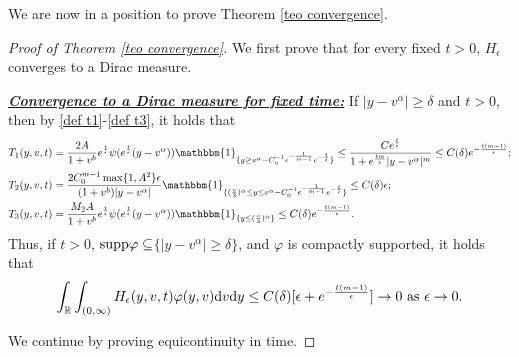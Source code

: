 \documentclass[11pt]{article}
\numberwithin{equation}{section}
\newcommand{\supp}{\textup{supp}}
\newcommand{\der}{\textup{d}}
\begin{document}
We are now in a position to prove Theorem \ref{teo convergence}.
\begin{proof}[Proof of Theorem \ref{teo convergence}] 

We first prove that for every fixed $t>0$, $H_{\epsilon}$ converges to a Dirac measure.

\vspace{0.2cm}

\noindent\underline{\textbf{\textit{Convergence to a Dirac measure for fixed time:}}} If $|y-v^{\alpha}|\geq \delta$ and $t>0$, then by \eqref{def t1}-\eqref{def t3}, it holds that
\begin{align*}
    T_{1}(y,v,t)&=  \frac{2A}{1+v^{b}}e^{\frac{t}{\epsilon}}\psi(e^{\frac{t}{\epsilon}}(y-v^{\alpha}))\mathbbm{1}_{\{y\geq v^{\alpha}-C_{0}^{-1}\epsilon^{-\frac{1}{m-1}}  e^{-\frac{t}{\epsilon}}\}}\leq \frac{ Ce^{\frac{t}{\epsilon}}}{1+e^{\frac{tm}{\epsilon}}|y-v^{\alpha}|^{m}}\leq C(\delta)e^{-\frac{t(m-1)}{\epsilon}};\\
   T_{2}(y,v,t)&=\frac{2C_{0}^{m-1}\max\{1,A^{2}\}\epsilon}{(1+v^{b})|y-v^{\alpha}|}\mathbbm{1}_{\{(\frac{v}{3})^{\alpha}\leq y\leq v^{\alpha}-C_{0}^{-1}\epsilon^{-\frac{1}{m-1}}  e^{-\frac{t}{\epsilon}}\}}\leq C(\delta)\epsilon;\\
     T_{3}(y,v,t)&=  \frac{M_{2}A}{1+v^{b}}e^{\frac{t}{\epsilon}}\psi(e^{\frac{t}{\epsilon}}(y-v^{\alpha}))\mathbbm{1}_{\{y\leq (\frac{v}{3})^{\alpha}\}}\leq C(\delta)e^{-\frac{t(m-1)}{\epsilon}}.
\end{align*}
Thus, if $t>0$, $\supp \varphi\subseteq $$\{|y-v^{\alpha}|\geq \delta\}$, and $\varphi$ is compactly supported, it holds that
\begin{align}\label{convergence to dirac for fixed time}
    \int_{\mathbb{R}}\int_{(0,\infty)}H_{\epsilon}(y,v,t)\varphi(y,v)\der v \der y\leq C(\delta)[\epsilon+e^{-\frac{t(m-1)}{\epsilon}}]\rightarrow 0 \textup{ as } \epsilon\rightarrow 0.
\end{align}


We continue by proving equicontinuity in time. 

\vspace{0.2cm}


\end{proof}
\end{document}
